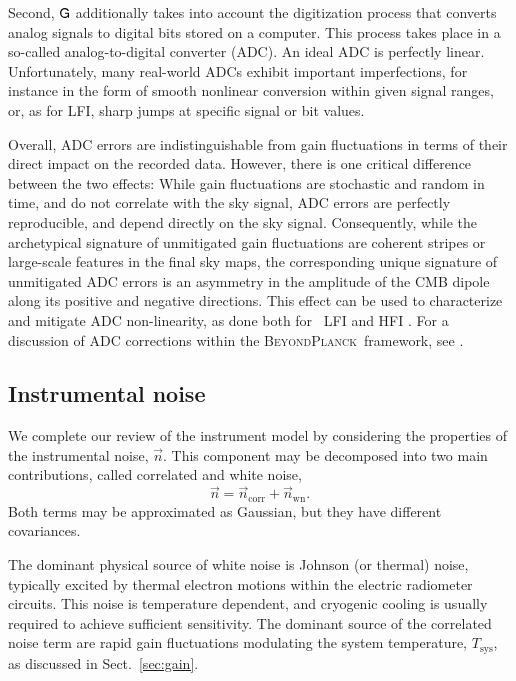 \documentclass[twocolumn]{aa}
\newcommand{\n}[0]{\vec{n}}
\renewcommand{\G}[0]{\tens{G}}
\newcommand{\BP}{\textsc{BeyondPlanck}}
\begin{document}
Second, $\G$ additionally takes into account the digitization process
that converts analog signals to digital bits stored on a
computer. This process takes place in a so-called analog-to-digital
converter (ADC). An ideal ADC is perfectly linear. Unfortunately, many
real-world ADCs exhibit important imperfections, for instance in the
form of smooth nonlinear conversion within given signal ranges, or,
as for LFI, sharp jumps at specific signal or bit values.

Overall, ADC errors are indistinguishable from gain fluctuations in
terms of their direct impact on the recorded data. However, there is
one critical difference between the two effects: While gain
fluctuations are stochastic and random in time, and do not correlate
with the sky signal, ADC errors are perfectly reproducible, and depend
directly on the sky signal. Consequently, while the archetypical
signature of unmitigated gain fluctuations are coherent stripes or
large-scale features in the final sky maps, the corresponding unique
signature of unmitigated ADC errors is an asymmetry in the amplitude
of the CMB dipole along its positive and negative directions. This
effect can be used to characterize and mitigate ADC non-linearity, as
done both for \Planck\ LFI and HFI
\citep{planck2016-l02,planck2016-l03,planck2020-LVII}. For a
discussion of ADC corrections within the \BP\ framework, see
\citet{bp25}.

\subsection{Instrumental noise}
\label{sec:noise}

We complete our review of the instrument model by considering the
properties of the instrumental noise, $\n$. This component may be
decomposed into two main contributions, called correlated and white
noise,
\begin{equation}
  \n = \n_{\mathrm{corr}} + \n_{\mathrm{wn}}.
  \label{eq:noise}
\end{equation}
Both terms may be approximated as Gaussian, but they have different
covariances.

The dominant physical source of white noise is Johnson (or thermal)
noise, typically excited by thermal electron motions within the
electric radiometer circuits. This noise is temperature dependent, and
cryogenic cooling is usually required to achieve sufficient
sensitivity. The dominant source of the correlated noise term are
rapid gain fluctuations modulating the system temperature,
$T_{\mathrm{sys}}$, as discussed in Sect.~\ref{sec:gain}.
\end{document}
